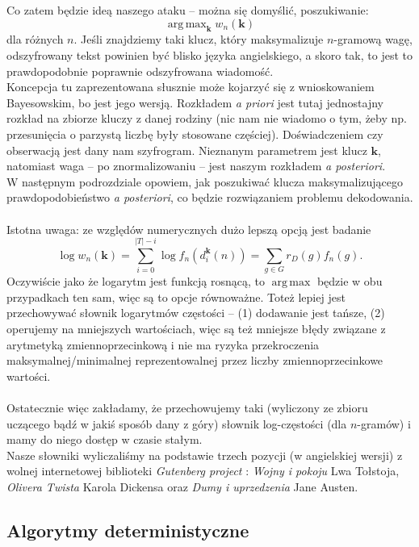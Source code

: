 \documentclass[a4paper]{article}
\DeclareMathOperator*{\argmax}{arg\,max}
\theoremstyle{defn}
\theoremstyle{theorem}
\theoremstyle{lemma}
\theoremstyle{cor}
\theoremstyle{fact}
\begin{document}
Co zatem będzie ideą naszego ataku – można się domyślić, poszukiwanie:
$$ \argmax_{\boldsymbol{k}} w_n(\boldsymbol{k}) $$
dla różnych $n$. Jeśli znajdziemy taki klucz, który maksymalizuje $n$-gramową wagę, odszyfrowany tekst powinien być blisko języka angielskiego, a skoro tak, to jest to prawdopodobnie poprawnie odszyfrowana wiadomość.\\
Koncepcja tu zaprezentowana słusznie może kojarzyć się z wnioskowaniem Bayesowskim, bo jest jego wersją. Rozkładem \textit{a priori} jest tutaj jednostajny rozkład na zbiorze kluczy z danej rodziny (nic nam nie wiadomo o tym, żeby np. przesunięcia o parzystą liczbę były stosowane częściej). Doświadczeniem czy obserwacją jest dany nam szyfrogram. Nieznanym parametrem jest klucz $\boldsymbol{k}$, natomiast waga – po znormalizowaniu – jest naszym rozkładem \textit{a posteriori}.\\
W następnym podrozdziale opowiem, jak poszukiwać klucza maksymalizującego prawdopodobieństwo \textit{a posteriori}, co będzie rozwiązaniem problemu dekodowania.\\\\
Istotna uwaga: ze względów numerycznych dużo lepszą opcją jest badanie $$\log w_n(\boldsymbol{k}) = \sum\limits_{i=0}^{|T|-i} \log f_n(d_i^{\boldsymbol{k}}(n)) = \sum\limits_{g \in G}{r_D(g)} f_n(g).$$
Oczywiście jako że logarytm jest funkcją rosnącą, to $\argmax$ będzie w obu przypadkach ten sam, więc są to opcje równoważne. Toteż lepiej jest przechowywać słownik logarytmów częstości – (1) dodawanie jest tańsze, (2) operujemy na mniejszych wartościach, więc są też mniejsze błędy związane z arytmetyką zmiennoprzecinkową i nie ma ryzyka przekroczenia maksymalnej/minimalnej reprezentowalnej przez liczby zmiennoprzecinkowe wartości.\\\\
Ostatecznie więc zakładamy, że przechowujemy taki (wyliczony ze zbioru uczącego bądź w jakiś sposób dany z góry) słownik log-częstości (dla $n$-gramów) i mamy do niego dostęp w czasie stałym.
\\
Nasze słowniki wyliczaliśmy na podstawie trzech pozycji (w angielskiej wersji) z wolnej internetowej biblioteki \textit{Gutenberg project} \cite{gutenberg}: \textit{Wojny i pokoju} Lwa Tołstoja, \textit{Olivera Twista} Karola Dickensa oraz \textit{Dumy i uprzedzenia} Jane Austen.
\subsection{Algorytmy deterministyczne}
\label{sect4.4}
\end{document}
